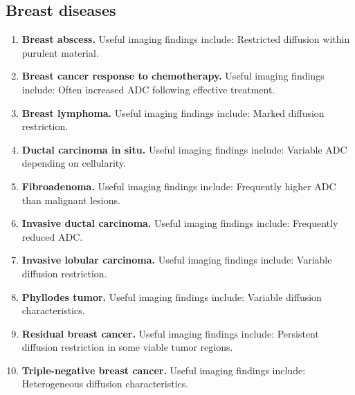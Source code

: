 \subsection{Breast diseases}
\begin{enumerate}[leftmargin=*,itemsep=0.45em,topsep=0.4em]
\item \textbf{Breast abscess.} Useful imaging findings include: Restricted diffusion within purulent material.
\item \textbf{Breast cancer response to chemotherapy.} Useful imaging findings include: Often increased ADC following effective treatment.
\item \textbf{Breast lymphoma.} Useful imaging findings include: Marked diffusion restriction.
\item \textbf{Ductal carcinoma in situ.} Useful imaging findings include: Variable ADC depending on cellularity.
\item \textbf{Fibroadenoma.} Useful imaging findings include: Frequently higher ADC than malignant lesions.
\item \textbf{Invasive ductal carcinoma.} Useful imaging findings include: Frequently reduced ADC.
\item \textbf{Invasive lobular carcinoma.} Useful imaging findings include: Variable diffusion restriction.
\item \textbf{Phyllodes tumor.} Useful imaging findings include: Variable diffusion characteristics.
\item \textbf{Residual breast cancer.} Useful imaging findings include: Persistent diffusion restriction in some viable tumor regions.
\item \textbf{Triple-negative breast cancer.} Useful imaging findings include: Heterogeneous diffusion characteristics.
\end{enumerate}


